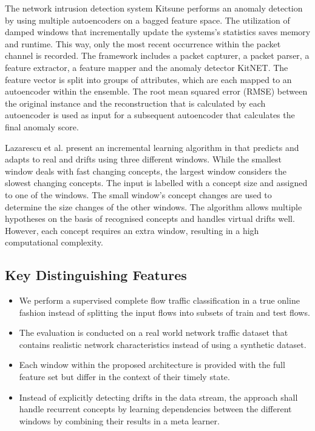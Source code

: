 \documentclass[conference]{IEEEtran}
\begin{document}
The network intrusion detection system Kitsune \cite{mirsky_kitsune_2018} performs an anomaly detection by using multiple autoencoders on a bagged feature space. The utilization of damped windows that incrementally update the systems's statistics saves memory and runtime. This way, only the most recent occurrence within the packet channel is recorded. The framework includes a packet capturer, a packet parser, a feature extractor, a feature mapper and the anomaly detector KitNET. The feature vector is split into groups of attributes, which are each mapped to an autoencoder within the ensemble. The root mean squared error (RMSE) between the original instance and the reconstruction that is calculated by each autoencoder is used as input for a subsequent autoencoder that calculates the final anomaly score.

Lazarescu et al. \cite{lazarescu_2004_using} present an incremental learning algorithm in that predicts and adapts to real and   drifts using three different windows. While the smallest window deals with fast changing concepts, the largest window considers the slowest changing concepts. The input is labelled with a concept size and assigned to one of the windows. The small window's concept changes are used to determine the size changes of the other windows. The algorithm allows multiple hypotheses on the basis of recognised concepts and handles virtual drifts well. However, each concept requires an extra window, resulting in a high computational complexity. 

\subsection{Key Distinguishing Features}

\begin{itemize}
    \item We perform a supervised complete flow traffic classification in a true online fashion instead of splitting the input flows into subsets of train and test flows.
    \item The evaluation is conducted on a real world network traffic dataset that contains realistic network characteristics instead of using a synthetic dataset.
    \item Each window within the proposed architecture is provided with the full feature set but differ in the context of their timely state.
    \item Instead of explicitly detecting drifts in the data stream, the approach shall handle recurrent concepts by learning dependencies between the different windows by combining their results in a meta learner. 
\end{itemize}
\end{document}
